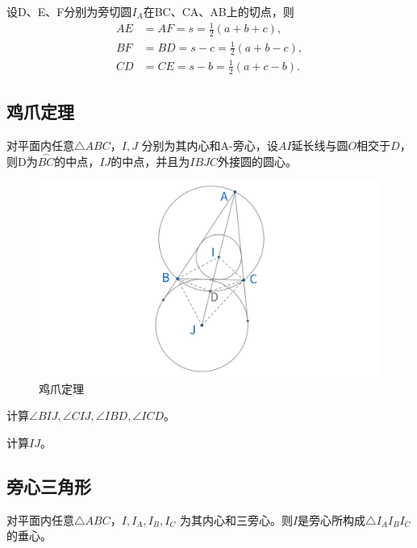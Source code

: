 \begin{proposition}[切线长性质]
    设D、E、F分别为旁切圆$I_A$在BC、CA、AB上的切点，则
    $$
    \begin{aligned}
    AE&=AF= s = \frac{1}{2}(a+b+c),\\
    BF&=BD=s - c =\frac{1}{2}(a+b-c),\\
    CD&=CE=s - b= \frac{1}{2}(a+c-b).
    \end{aligned}
    $$
\end{proposition}


\newpage 
\subsection{鸡爪定理}
\begin{theorem}[鸡爪定理]
    对平面内任意$\triangle ABC$，$I,J$ 分别为其内心和A-旁心，设$AI$延长线与圆$O$相交于$D$，则D为$\overset{{\frown}}{BC}$的中点，$IJ$的中点，并且为$IBJC$外接圆的圆心。
\end{theorem}

\begin{figure}[H]
    \centering
    \includegraphics[width=\linewidth]{figures/三角形五心/鸡爪定理2.png}
    \caption{鸡爪定理}
\end{figure}

\begin{exercise}
    计算$\angle BIJ, \angle CIJ, \angle IBD, \angle ICD$。
\end{exercise}
\begin{exercise}
    计算$IJ$。
\end{exercise}


\newpage 
\subsection{旁心三角形}
\begin{proposition}[旁心三角形]
    对平面内任意$\triangle ABC$，$I, I_A,I_B,I_C$ 为其内心和三旁心。则$I$是旁心所构成$\triangle I_AI_BI_C$ 的垂心。
\end{proposition}

